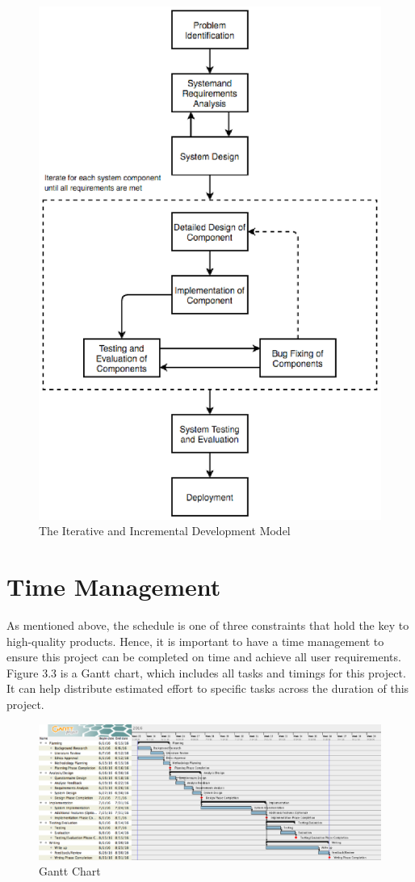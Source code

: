 \begin{figure}[H]
  \centering
  \includegraphics[width=12cm]{./img/Picture2}
  \caption{The Iterative and Incremental Development Model}
  \label{Figure:figex}
\end{figure}


\section{Time Management}

As mentioned above, the schedule is one of three constraints that hold the key to high-quality products. Hence, it is important to have a time management to ensure this project can be completed on time and achieve all user requirements.  Figure 3.3 is a Gantt chart, which includes all tasks and timings for this project. It can help distribute estimated effort to specific tasks across the duration of this project.

\begin{figure}[H]
  \centering
  \includegraphics[width=15cm]{./img/Picture3}
  \caption{Gantt Chart}
  \label{Figure:figex}
\end{figure}

